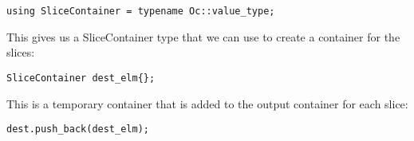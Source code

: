 \begin{lstlisting}[style=styleCXX]
using SliceContainer = typename Oc::value_type;
\end{lstlisting}

This gives us a SliceContainer type that we can use to create a container for the slices:

\begin{lstlisting}[style=styleCXX]
SliceContainer dest_elm{};
\end{lstlisting}

This is a temporary container that is added to the output container for each slice:

\begin{lstlisting}[style=styleCXX]
dest.push_back(dest_elm);
\end{lstlisting}








